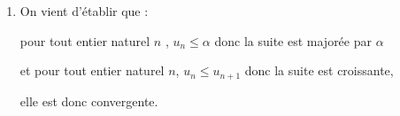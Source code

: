\documentclass[10pt]{article}
\begin{document}
\begin{enumerate}
\begin{enumerate}
Si l'inégalité est vérifiée à l'indice $n$,  alors, elle l'est aussi au rang suivant.

\emph{Conclusion :} L'inégalité est vérifiée à l'indice 0 et sa véracité est héréditaire pour tout indice $n$ naturel, donc, par principe de récurrence, on a  $-1 \leqslant u_n \leqslant u_{n+1} \leqslant\alpha$ pour tout entier naturel $n$.

	\item On vient d'établir que :

pour tout entier naturel $n$ , $u_n \leqslant\alpha$ donc la suite est majorée par $\alpha$

et  pour tout entier naturel $n$, $u_n \leqslant u_{n+1}$ donc la suite est  croissante, 

elle est donc convergente.
	\end{enumerate}
\end{enumerate}

\bigskip
\end{document}
